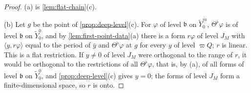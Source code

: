 \begin{proof}
(a) is \cref{lem:flat-chain}(c).

(b) Let $g$ be the point of \cref{prop:deep-level}(c). For $\varphi$ of level $\mathfrak b$ on $\tilde Y^m_0$, $\Theta^\flat\varphi$ is of level $\mathfrak b$ on $\tilde Y^0_0$, and by \cref{lem:first-point-data}(a) there is a form $r\varphi$ of level $J_M$ with
$\langle y,r\varphi\rangle$ equal to the period of $\bar y$ and $\Theta^\flat\varphi$ at $g$ for every $y$ of level $\varpi Q$; $r$ is linear. This is a flat restriction. If $y\ne0$ of level $J_M$ were orthogonal to the range of $r$, it would be
orthogonal to the restrictions of all $\Theta^\flat\varphi$, that is, by (a), of all forms of level $\mathfrak b$ on $\tilde Y^0_0$, and \cref{prop:deep-level}(c) gives $y=0$; the forms of level $J_M$ form a finite-dimensional space, so $r$ is
onto.


\end{proof}
